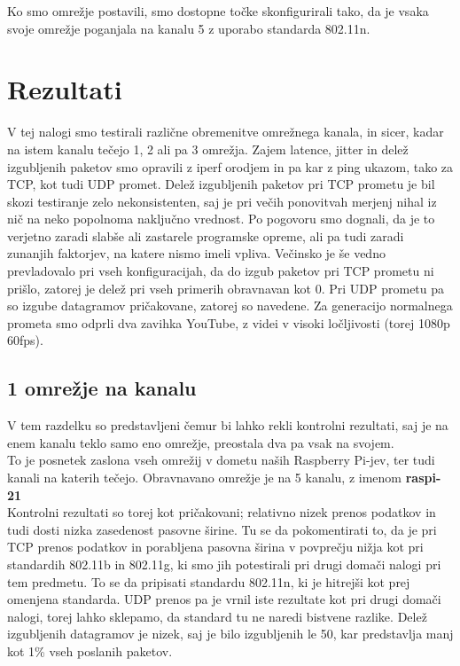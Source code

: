 \documentclass[11pt,a4paper,slovene]{article}
\begin{document}
Ko smo omrežje postavili, smo dostopne točke skonfigurirali tako, da je vsaka svoje omrežje poganjala na kanalu 5 z uporabo standarda 802.11n.

\section{Rezultati}
V tej nalogi smo testirali različne obremenitve omrežnega kanala, in sicer, kadar na istem kanalu tečejo 1, 2 ali pa 3 omrežja. Zajem latence, jitter in delež izgubljenih paketov smo opravili z iperf orodjem in pa kar z ping ukazom, tako za TCP, kot tudi UDP promet. Delež izgubljenih paketov pri TCP prometu je bil skozi testiranje zelo nekonsistenten, saj je pri večih ponovitvah merjenj nihal iz nič na neko popolnoma naključno vrednost. Po pogovoru smo dognali, da je to verjetno zaradi slabše ali zastarele programske opreme, ali pa tudi zaradi zunanjih faktorjev, na katere nismo imeli vpliva. Večinsko je še vedno prevladovalo pri vseh konfiguracijah, da do izgub paketov pri TCP prometu ni prišlo, zatorej je delež pri vseh primerih obravnavan kot 0. Pri UDP prometu pa so izgube datagramov pričakovane, zatorej so navedene.
Za generacijo normalnega prometa smo odprli dva zavihka YouTube, z videi v visoki ločljivosti (torej 1080p 60fps).\\

\subsection{1 omrežje na kanalu}
V tem razdelku so predstavljeni čemur bi lahko rekli kontrolni rezultati, saj je na enem kanalu teklo samo eno omrežje, preostala dva pa vsak na svojem.\\

To je posnetek zaslona vseh omrežij v dometu naših Raspberry Pi-jev, ter tudi kanali na katerih tečejo. Obravnavano omrežje je na 5 kanalu, z imenom \textbf{raspi-21}\\

Kontrolni rezultati so torej kot pričakovani; relativno nizek prenos podatkov in tudi dosti nizka zasedenost pasovne širine. Tu se da pokomentirati to, da je pri TCP prenos podatkov in porabljena pasovna širina v povprečju nižja kot pri standardih 802.11b in 802.11g, ki smo jih potestirali pri drugi domači nalogi pri tem predmetu. To se da pripisati standardu 802.11n, ki je hitrejši kot prej omenjena standarda. UDP prenos pa je vrnil iste rezultate kot pri drugi domači nalogi, torej lahko sklepamo, da standard tu ne naredi bistvene razlike. Delež izgubljenih datagramov je nizek, saj je bilo izgubljenih le 50, kar predstavlja manj kot 1\% vseh poslanih paketov.
\end{document}
